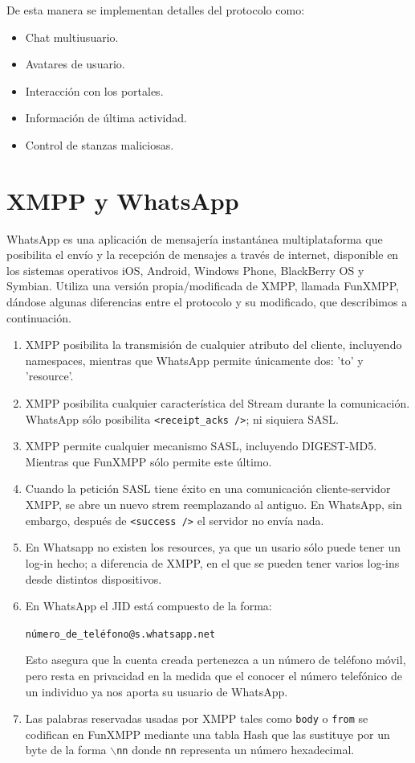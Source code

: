 \documentclass[a4paper, 11pt]{article} %
\begin{document}
    De esta manera se implementan detalles del protocolo como:
    \begin{itemize}
     \item Chat multiusuario.
     \item Avatares de usuario.
     \item Interacción con los portales.
     \item Información de última actividad.
     \item Control de stanzas maliciosas.
    \end{itemize}

\section{XMPP y WhatsApp}
  WhatsApp es una aplicación de mensajería instantánea multiplataforma que posibilita el envío y la recepción de mensajes a 
  través de internet, disponible en los sistemas operativos iOS, Android, Windows Phone, BlackBerry OS y Symbian. Utiliza una
  versión propia/modificada de XMPP, llamada FunXMPP, dándose algunas diferencias entre el protocolo y su modificado, que
  describimos a continuación.

  \begin{enumerate}
    \item XMPP posibilita la transmisión de cualquier atributo del cliente, incluyendo namespaces, mientras que WhatsApp
      permite únicamente dos: 'to' y 'resource'. %
    \item XMPP posibilita cualquier característica del Stream durante la comunicación. 
      WhatsApp sólo posibilita \texttt{<receipt\_acks />}; ni siquiera SASL.
    \item XMPP permite cualquier mecanismo SASL, incluyendo DIGEST-MD5. Mientras que FunXMPP sólo permite este último.
    \item Cuando la petición SASL tiene éxito en una comunicación cliente-servidor XMPP, se abre un nuevo strem reemplazando al antiguo.
      En WhatsApp, sin embargo, después de \texttt{<success />} el servidor no envía nada.
    \item En Whatsapp no existen los resources, ya que un usario sólo puede tener un log-in hecho; a diferencia de XMPP, en
      el que se pueden tener varios log-ins desde distintos dispositivos.
    \item En WhatsApp el JID está compuesto de la forma:
      \begin{center}
	\texttt{número\_de\_teléfono@s.whatsapp.net}
      \end{center}
      Esto asegura que la cuenta creada pertenezca a un número de teléfono móvil, pero resta en privacidad en la medida
      que el conocer el número telefónico de un individuo ya nos aporta su usuario de WhatsApp.
    \item Las palabras reservadas usadas por XMPP tales como \texttt{body} o \texttt{from} se codifican en FunXMPP mediante
      una tabla Hash que las sustituye por un byte de la forma $\backslash$\texttt{nn} donde \texttt{nn} representa un número
      hexadecimal.
  \end{enumerate}
\end{document}
